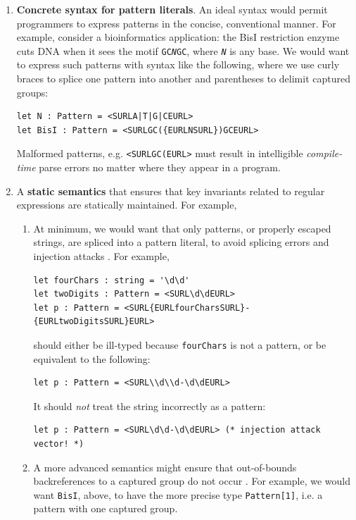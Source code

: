 \begin{enumerate}
\item \textbf{Concrete syntax for pattern literals}. An ideal syntax would permit programmers to express patterns in the concise, conventional manner. For example, consider a bioinformatics  application: the BisI restriction enzyme cuts DNA when it sees the motif \texttt{GC\textit{N}GC}, where \texttt{\textit{N}} is any base. We would want to express such patterns with syntax like the following, where we use curly braces to splice one pattern into another and parentheses to delimit captured groups:
\begin{lstlisting}[numbers=none]
let N : Pattern = <SURLA|T|G|CEURL>
let BisI : Pattern = <SURLGC({EURLNSURL})GCEURL>\end{lstlisting}
Malformed patterns, e.g. \lstinline{<SURLGC(EURL>} must result in intelligible \emph{compile-time} parse errors no matter where they appear in a program.
\item A \textbf{static semantics} that ensures that key invariants related to regular expressions are statically maintained. For example, 
	\begin{enumerate}
	\item At minimum, we would want that only patterns, or properly escaped strings, are spliced into a pattern literal, to avoid splicing errors and injection attacks \cite{owasp2013, Bravenboer:2007:PIA:1289971.1289975}. For example,
\begin{lstlisting}[numbers=none]
let fourChars : string = '\d\d'
let twoDigits : Pattern = <SURL\d\dEURL>
let p : Pattern = <SURL{EURLfourCharsSURL}-{EURLtwoDigitsSURL}EURL>
\end{lstlisting}
    should either be ill-typed because \lstinline{fourChars} is not a pattern, or be equivalent to the following:
\begin{lstlisting}[numbers=none]
let p : Pattern = <SURL\\d\\d-\d\dEURL>
\end{lstlisting}
    It should \emph{not} treat the string incorrectly as a pattern:
\begin{lstlisting}[numbers=none]
let p : Pattern = <SURL\d\d-\d\dEURL> (* injection attack vector! *)
\end{lstlisting}
	\item A more advanced semantics might ensure that out-of-bounds backreferences to a captured group do not occur \cite{spishak2012type}. For example, we would want \verb|BisI|, above, to have the more precise type \verb|Pattern[1]|, i.e. a pattern with one captured group. 

\end{enumerate}
\end{enumerate}
